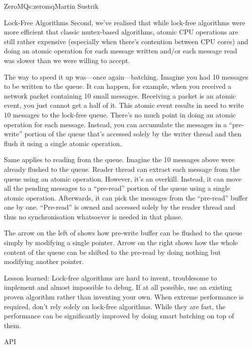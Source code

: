 \begin{aosachapter}{ZeroMQ}{s:zeromq}{Martin Sustrik}
\begin{aosasect1}{Lock-Free Algorithms}
Second, we've realised that while lock-free algorithms were more
efficient that classic mutex-based algorithms, atomic CPU operations
are still rather expensive (especially when there's contention between
CPU cores) and doing an atomic operation for each message written
and/or each message read was slower than we were willing to accept.

The way to speed it up was---once again---batching.  Imagine you had
10 messages to be written to the queue. It can happen, for example,
when you received a network packet containing 10 small
messages. Receiving a packet is an atomic event, you just cannot get a
half of it. This atomic event results in need to write 10 messages to
the lock-free queue. There's no much point in doing an atomic
operation for each message. Instead, you can accumulate the messages
in a ``pre-write'' portion of the queue that's accessed solely by the
writer thread and then flush it using a single atomic operation.

Same applies to reading from the queue. Imagine the 10 messages above
were already flushed to the queue. Reader thread can extract each
message from the queue using an atomic operation. However, it's an
overkill. Instead, it can move all the pending messages to a
``pre-read'' portion of the queue using a single atomic
operation. Afterwards, it can pick the messages from the ``pre-read''
buffer one by one. ``Pre-read'' is owned and accessed solely by the
reader thread and thus no synchronisation whatsoever is needed in that
phase.


The arrow on the left of  shows how
pre-write buffer can be flushed to the queue simply by modifying a
single pointer. Arrow on the right shows how the whole content of the
queue can be shifted to the pre-read by doing nothing but modifying
another pointer.

Lesson learned: Lock-free algorithms are hard to invent, troublesome
to implement and almost impossible to debug. If at all possible, use
an existing proven algorithm rather than inventing your own. When
extreme performance is required, don't rely solely on lock-free
algorithms. While they are fast, the performance can be significantly
improved by doing smart batching on top of them.

\end{aosasect1}

\begin{aosasect1}{API}


\end{aosasect1}
\end{aosachapter}
